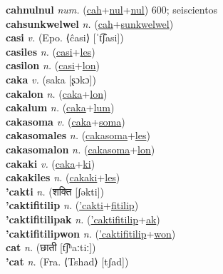 \textbf{cahnulnul} \textit{num.} (\hyperref[cah]{cah}+\hyperref[nul]{nul}+\hyperref[nul]{nul})
600; seiscientos \label{cahnulnul} \\
\textbf{cahsunkwelwel} \textit{n.} (\hyperref[cah]{cah}+\hyperref[sunkwelwel]{sunkwelwel})
 \label{cahsunkwelwel} \\
\textbf{casi} \textit{v.} (Epo. ⟨ĉasi⟩ [ˈt͡ʃasi])
 \label{casi} \\
\textbf{casiles} \textit{n.} (\hyperref[casi]{casi}+\hyperref[les]{les})
 \label{casiles} \\
\textbf{casilon} \textit{n.} (\hyperref[casi]{casi}+\hyperref[lon]{lon})
 \label{casilon} \\
\textbf{caka} \textit{v.} ({\javanese{}saka} [ʂɔkɔ])
 \label{caka} \\
\textbf{cakalon} \textit{n.} (\hyperref[caka]{caka}+\hyperref[lon]{lon})
 \label{cakalon} \\
\textbf{cakalum} \textit{n.} (\hyperref[caka]{caka}+\hyperref[lum]{lum})
 \label{cakalum} \\
\textbf{cakasoma} \textit{v.} (\hyperref[caka]{caka}+\hyperref[soma]{soma})
 \label{cakasoma} \\
\textbf{cakasomales} \textit{n.} (\hyperref[cakasoma]{cakasoma}+\hyperref[les]{les})
 \label{cakasomales} \\
\textbf{cakasomalon} \textit{n.} (\hyperref[cakasoma]{cakasoma}+\hyperref[lon]{lon})
 \label{cakasomalon} \\
\textbf{cakaki} \textit{v.} (\hyperref[caka]{caka}+\hyperref[ki]{ki})
 \label{cakaki} \\
\textbf{cakakiles} \textit{n.} (\hyperref[cakaki]{cakaki}+\hyperref[les]{les})
 \label{cakakiles} \\
\textbf{'cakti} \textit{n.} ({\devanagari{}शक्ति} [ʃəkti])
 \label{'cakti} \\
\textbf{'caktifitilip} \textit{n.} (\hyperref['cakti]{'cakti}+\hyperref[fitilip]{fitilip})
 \label{'caktifitilip} \\
\textbf{'caktifitilipak} \textit{n.} (\hyperref['caktifitilip]{'caktifitilip}+\hyperref[ak]{ak})
 \label{'caktifitilipak} \\
\textbf{'caktifitilipwon} \textit{n.} (\hyperref['caktifitilip]{'caktifitilip}+\hyperref[won]{won})
 \label{'caktifitilipwon} \\
\textbf{cat} \textit{n.} ({\devanagari{}छाती} [t͡ʃʰaːtiː])
 \label{cat} \\
\textbf{'cat} \textit{n.} (Fra. ⟨Tshad⟩ [tʃad])
 \label{'cat} \\
